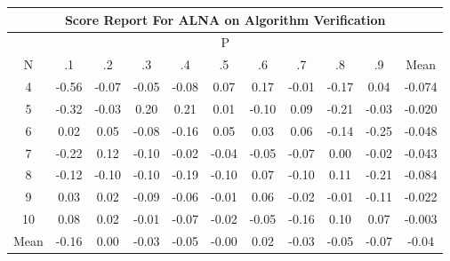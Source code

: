 \documentclass[11pt,a4paper]{report}
\begin{document}
\begin{longtable}{ | c || c | c | c | c | c | c | c | c | c || c |}
\hline
\multicolumn{11}{|c|}{ Score Report For ALNA on Algorithm Verification} \\
\hline
\multicolumn{11}{|c|}{ P } \\
\hline
N & .1 & .2 & .3 & .4 & .5 & .6 & .7 & .8 & .9 & Mean\\
 \hline
 \hline
 \endhead
  4 &  \cellcolor[HTML]{FFEFEF} -0.56 &  \cellcolor[HTML]{FFFFFF} -0.07 &  \cellcolor[HTML]{FFFFFF} -0.05 &  \cellcolor[HTML]{FFFFFF} -0.08 &  \cellcolor[HTML]{FFFFFF} 0.07 &  \cellcolor[HTML]{F7F7FF} 0.17 &  \cellcolor[HTML]{FFFFFF} -0.01 &  \cellcolor[HTML]{FFF7F7} -0.17 &  \cellcolor[HTML]{FFFFFF} 0.04 & -0.074 \\
  5 &  \cellcolor[HTML]{FFF7F7} -0.32 &  \cellcolor[HTML]{FFFFFF} -0.03 &  \cellcolor[HTML]{F7F7FF} 0.20 &  \cellcolor[HTML]{F7F7FF} 0.21 &  \cellcolor[HTML]{FFFFFF} 0.01 &  \cellcolor[HTML]{FFFFFF} -0.10 &  \cellcolor[HTML]{FFFFFF} 0.09 &  \cellcolor[HTML]{FFF7F7} -0.21 &  \cellcolor[HTML]{FFFFFF} -0.03 & -0.020 \\
  6 &  \cellcolor[HTML]{FFFFFF} 0.02 &  \cellcolor[HTML]{FFFFFF} 0.05 &  \cellcolor[HTML]{FFFFFF} -0.08 &  \cellcolor[HTML]{FFFFFF} -0.16 &  \cellcolor[HTML]{FFFFFF} 0.05 &  \cellcolor[HTML]{FFFFFF} 0.03 &  \cellcolor[HTML]{FFFFFF} 0.06 &  \cellcolor[HTML]{FFFFFF} -0.14 &  \cellcolor[HTML]{FFF7F7} -0.25 & -0.048 \\
  7 &  \cellcolor[HTML]{FFF7F7} -0.22 &  \cellcolor[HTML]{FFFFFF} 0.12 &  \cellcolor[HTML]{FFFFFF} -0.10 &  \cellcolor[HTML]{FFFFFF} -0.02 &  \cellcolor[HTML]{FFFFFF} -0.04 &  \cellcolor[HTML]{FFFFFF} -0.05 &  \cellcolor[HTML]{FFFFFF} -0.07 &  \cellcolor[HTML]{FFFFFF} 0.00 &  \cellcolor[HTML]{FFFFFF} -0.02 & -0.043 \\
  8 &  \cellcolor[HTML]{FFFFFF} -0.12 &  \cellcolor[HTML]{FFFFFF} -0.10 &  \cellcolor[HTML]{FFFFFF} -0.10 &  \cellcolor[HTML]{FFF7F7} -0.19 &  \cellcolor[HTML]{FFFFFF} -0.10 &  \cellcolor[HTML]{FFFFFF} 0.07 &  \cellcolor[HTML]{FFFFFF} -0.10 &  \cellcolor[HTML]{FFFFFF} 0.11 &  \cellcolor[HTML]{FFF7F7} -0.21 & -0.084 \\
  9 &  \cellcolor[HTML]{FFFFFF} 0.03 &  \cellcolor[HTML]{FFFFFF} 0.02 &  \cellcolor[HTML]{FFFFFF} -0.09 &  \cellcolor[HTML]{FFFFFF} -0.06 &  \cellcolor[HTML]{FFFFFF} -0.01 &  \cellcolor[HTML]{FFFFFF} 0.06 &  \cellcolor[HTML]{FFFFFF} -0.02 &  \cellcolor[HTML]{FFFFFF} -0.01 &  \cellcolor[HTML]{FFFFFF} -0.11 & -0.022 \\
  10 &  \cellcolor[HTML]{FFFFFF} 0.08 &  \cellcolor[HTML]{FFFFFF} 0.02 &  \cellcolor[HTML]{FFFFFF} -0.01 &  \cellcolor[HTML]{FFFFFF} -0.07 &  \cellcolor[HTML]{FFFFFF} -0.02 &  \cellcolor[HTML]{FFFFFF} -0.05 &  \cellcolor[HTML]{FFF7F7} -0.16 &  \cellcolor[HTML]{FFFFFF} 0.10 &  \cellcolor[HTML]{FFFFFF} 0.07 & -0.003 \\
 \hline
 \hline
Mean &  \cellcolor[HTML]{FFFFFF} -0.16 &  \cellcolor[HTML]{FFFFFF} 0.00 &  \cellcolor[HTML]{FFFFFF} -0.03 &  \cellcolor[HTML]{FFFFFF} -0.05 &  \cellcolor[HTML]{FFFFFF} -0.00 &  \cellcolor[HTML]{FFFFFF} 0.02 &  \cellcolor[HTML]{FFFFFF} -0.03 &  \cellcolor[HTML]{FFFFFF} -0.05 &  \cellcolor[HTML]{FFFFFF} -0.07 &  \cellcolor[HTML]{FFFFFF} -0.04
\end{longtable}
\end{document}
